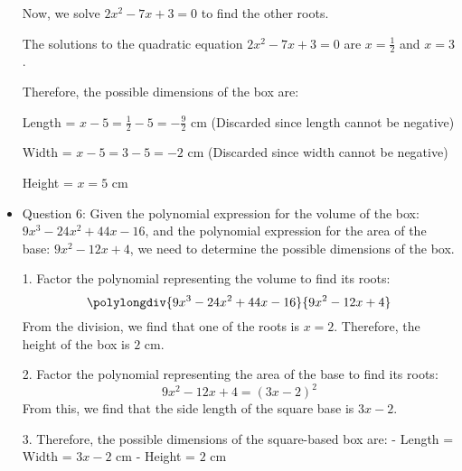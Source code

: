 \documentclass{article}
\begin{document}
\begin{itemize}
Now, we solve \(2x^2 - 7x + 3 = 0\) to find the other roots.

The solutions to the quadratic equation \(2x^2 - 7x + 3 = 0\) are \(x = \frac{1}{2}\) and \(x = 3\).

Therefore, the possible dimensions of the box are:

Length = \(x - 5 = \frac{1}{2} - 5 = -\frac{9}{2}\) cm (Discarded since length cannot be negative)

Width = \(x - 5 = 3 - 5 = -2\) cm (Discarded since width cannot be negative)

Height = \(x = 5\) cm

\item Question 6:
Given the polynomial expression for the volume of the box: \(9x^3 - 24x^2 + 44x - 16\), and the polynomial expression for the area of the base: \(9x^2 - 12x + 4\), we need to determine the possible dimensions of the box.

1. Factor the polynomial representing the volume to find its roots:
\[
\polylongdiv{9x^3 - 24x^2 + 44x - 16}{9x^2 - 12x + 4}
\]
From the division, we find that one of the roots is \(x = 2\). Therefore, the height of the box is \(2\) cm.

2. Factor the polynomial representing the area of the base to find its roots:
\[
9x^2 - 12x + 4 = (3x - 2)^2
\]
From this, we find that the side length of the square base is \(3x - 2\).

3. Therefore, the possible dimensions of the square-based box are:
   - Length = Width = \(3x - 2\) cm
   - Height = \(2\) cm

\end{itemize}
\end{document}
